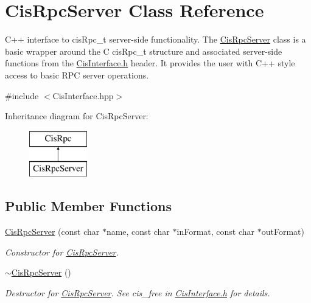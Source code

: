 \hypertarget{classCisRpcServer}{}\section{Cis\+Rpc\+Server Class Reference}
\label{classCisRpcServer}


C++ interface to cis\+Rpc\+\_\+t server-\/side functionality. The \mbox{\hyperlink{classCisRpcServer}{Cis\+Rpc\+Server}} class is a basic wrapper around the C cis\+Rpc\+\_\+t structure and associated server-\/side functions from the \mbox{\hyperlink{CisInterface_8h_source}{Cis\+Interface.\+h}} header. It provides the user with C++ style access to basic R\+PC server operations.  




{\ttfamily \#include $<$Cis\+Interface.\+hpp$>$}

Inheritance diagram for Cis\+Rpc\+Server\+:\begin{figure}[H]
\begin{center}
\leavevmode
\includegraphics[height=2.000000cm]{classCisRpcServer}
\end{center}
\end{figure}
\subsection*{Public Member Functions}
\begin{DoxyCompactItemize}
\item 
\mbox{\hyperlink{classCisRpcServer_a4d531d6b97d3916f9b4fe9398b71f60f}{Cis\+Rpc\+Server}} (const char $\ast$name, const char $\ast$in\+Format, const char $\ast$out\+Format)
\begin{DoxyCompactList}\small\item\em Constructor for \mbox{\hyperlink{classCisRpcServer}{Cis\+Rpc\+Server}}. \end{DoxyCompactList}\item 
\mbox{\label{classCisRpcServer_a5681ecdcbcd03ad613f4843c39a3403b}} 
\mbox{\hyperlink{classCisRpcServer_a5681ecdcbcd03ad613f4843c39a3403b}{$\sim$\+Cis\+Rpc\+Server}} ()
\begin{DoxyCompactList}\small\item\em Destructor for \mbox{\hyperlink{classCisRpcServer}{Cis\+Rpc\+Server}}. See cis\+\_\+free in \mbox{\hyperlink{CisInterface_8h_source}{Cis\+Interface.\+h}} for details. \end{DoxyCompactList}\end{DoxyCompactItemize}


